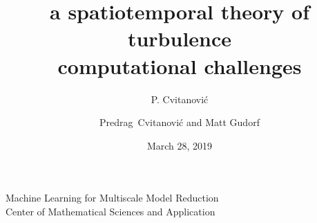 


\usepackage[font=scriptsize, labelfont=bf]{caption}
\usepackage[
    backend=biber,  %
    sorting=nyt,
    style=numeric, %
    natbib=true,
    style=phys, %
    biblabel= brackets, %
    articletitle=false, %
    pageranges = true , %
    sortlocale=en_US,
    firstinits=true,
    url=false, %
    doi=false, %
    eprint=false
]{biblatex}


\renewcommand{\Ssym}[1]{{\ensuremath{m_{#1}}}}    %

\makeatletter
\let\@@magyar@captionfix\relax
\makeatother




\title{
{a spatiotemporal theory of}
{\huge turbulence}
    \\
{computational challenges}
}
\author{P. Cvitanovi\'c}
\author[Cvitanovi\'c]
{
  \textcolor{green!50!black}{
  {Predrag~Cvitanovi\'c
  and
  Matt Gudorf
  }	%
  }
}
\institute
{
{Machine Learning for Multiscale Model Reduction}
\\
                Center of Mathematical Sciences and Application


 }
\date{March 28, 2019}

